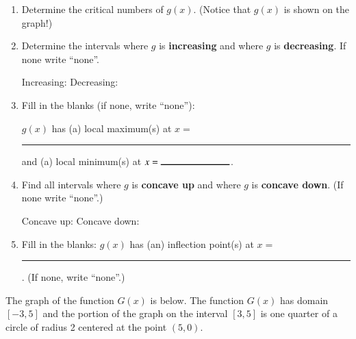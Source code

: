 \documentclass[12pt]{article}
\renewcommand{\emph}[1]{\textsf{\textbf{#1}}}
\newcommand{\blank}[1]{\rule{#1}{0.75pt}}
\newcounter{probcount}
\newcounter{subprobcount}
\def\problem#1{\setcounter{subprobcount}{0}%
\addtocounter{probcount}{1}{\emph{\arabic{probcount}.\hskip 1em(#1)}}\par}
\newenvironment{subproblems}{%
\begin{enumerate}%
\setcounter{enumi}{\value{subprobcount}}%
\renewcommand{\theenumi}{\emph{\alph{enumi}}}}%
{\setcounter{subprobcount}{\value{enumi}}\end{enumerate}}
\begin{document}
\begin{subproblems}

\item Determine the critical numbers of $g(x).$ (Notice that $g(x)$ is \fbox{\emph{not}} shown on the graph!)

	\vspace{1cm}
	

	\item Determine the intervals where $g$ is \emph{increasing} and where $g$ is \emph{decreasing}. If none write ``none''.
	\vfill
		
	Increasing: \hrulefill \hspace{1cm} Decreasing:\hrulefill	
	
	\item Fill in the blanks (if none, write ``none''): 
	
	$g(x)$ has (a) local maximum(s) at $x = $ \blank{1in} and (a) local minimum(s) at $x = \blank{1in} $. 
	
	\item Find all intervals where $g$ is \emph{concave up} and where $g$ is \emph{concave down}.  (If none write ``none''.)
		\vfill

	Concave up: \hrulefill \hspace{1cm} Concave down:\hrulefill	
	
	
	\item Fill in the blanks: $g(x)$ has (an) inflection point(s) at $x =$ \blank{1in}. (If none, write ``none''.)
	

\end{subproblems}


\newpage

\problem{12 points} The  graph of the function $G(x)$ is below. The function $G(x)$ has domain $[-3,5]$ and the portion of the graph on the interval $[3,5]$ is one quarter of a circle of radius 2 centered at the point $(5,0).$\\
\def\th{.75}
\begin{center}
\end{center}
\end{document}
